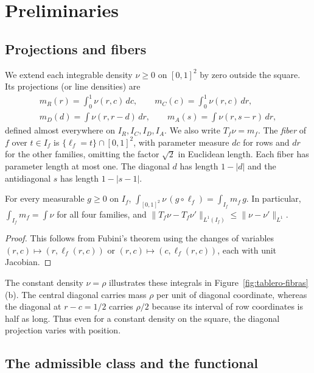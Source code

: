 \section{Preliminaries}\label{sec:preliminares}

\subsection{Projections and fibers}

We extend each integrable density $\nu\ge0$ on $[0,1]^2$ by zero outside the square. Its projections (or line densities) are \begin{gather*}
 m_R(r)=\int_0^1\nu(r,c)\,dc,\qquad m_C(c)=\int_0^1\nu(r,c)\,dr,\\
 m_D(d)=\int\nu(r,r-d)\,dr,\qquad m_A(s)=\int\nu(r,s-r)\,dr,
\end{gather*} defined almost everywhere on $I_R,I_C,I_D,I_A$. We also write $T_f\nu=m_f$. The \emph{fiber} of $f$ over $t\in I_f$ is
$\{\ell_f=t\}\cap[0,1]^2$, with parameter measure $dc$ for rows and $dr$ for the other families, omitting the factor $\sqrt2$ in
Euclidean length. Each fiber has parameter length at most one. The diagonal $d$ has length $1-|d|$ and the antidiagonal $s$ has
length $1-|s-1|$.

\begin{lema}\label{lem:fubini} For every measurable $g\ge0$ on $I_f$, $\int_{[0,1]^2}\nu\,(g\circ\ell_f)=\int_{I_f}m_f\,g$. In
particular, $\int_{I_f}m_f=\int\nu$ for all four families, and $\|T_f\nu-T_f\nu'\|_{L^1(I_f)}\le\|\nu-\nu'\|_{L^1}$. \end{lema}

\begin{proof} This follows from Fubini's theorem using the changes of variables $(r,c)\mapsto(r,\ell_f(r,c))$ or
$(r,c)\mapsto(c,\ell_f(r,c))$, each with unit Jacobian. \end{proof}

The constant density $\nu=\rho$ illustrates these integrals in Figure~\ref{fig:tablero-fibras}(b). The central diagonal carries mass
$\rho$ per unit of diagonal coordinate, whereas the diagonal at $r-c=1/2$ carries $\rho/2$ because its interval of row coordinates is
half as long. Thus even for a constant density on the square, the diagonal projection varies with position.

\subsection{The admissible class and the functional}

